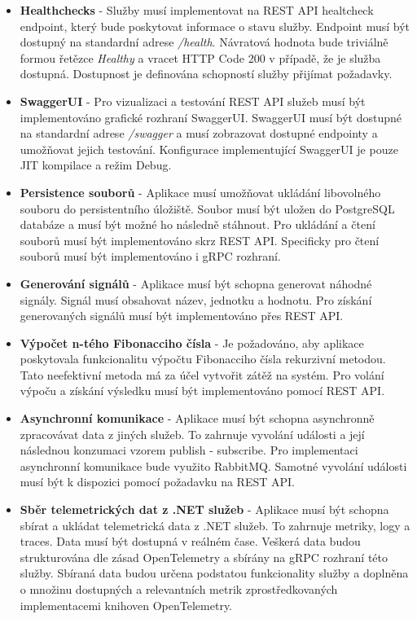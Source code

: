 \begin{itemize}
  \item \textbf{Healthchecks} - Služby musí implementovat na REST API healtcheck endpoint, který bude poskytovat informace o stavu služby. Endpoint musí být dostupný na standardní adrese \emph{/health}. Návratová hodnota bude triviálně formou řetězce \emph{Healthy} a vracet HTTP Code 200 v případě, že je služba dostupná. Dostupnost je definována schopností služby přijímat požadavky.
  \item \textbf{SwaggerUI} - Pro vizualizaci a testování REST API služeb musí být implementováno grafické rozhraní SwaggerUI. SwaggerUI musí být dostupné na standardní adrese \emph{/swagger} a musí zobrazovat dostupné endpointy a umožňovat jejich testování. Konfigurace implementující SwaggerUI je pouze JIT kompilace a režim Debug.
  \item \textbf{Persistence souborů} - Aplikace musí umožňovat ukládání libovolného souboru do persistentního úložiště. Soubor musí být uložen do PostgreSQL databáze a musí být možné ho následně stáhnout. Pro ukládání a čtení souborů musí být implementováno skrz REST API. Specificky pro čtení souborů musí být implementováno i gRPC rozhraní.
  \item \textbf{Generování signálů} - Aplikace musí být schopna generovat náhodné signály. Signál musí obsahovat název, jednotku a hodnotu. Pro získání generovaných signálů musí být implementováno přes REST API.
  \item \textbf{Výpočet n-tého Fibonacciho čísla} - Je požadováno, aby aplikace poskytovala funkcionalitu výpočtu Fibonacciho čísla rekurzivní metodou. Tato neefektivní metoda má za účel vytvořit zátěž na systém. Pro volání výpoču a získání výsledku musí být implementováno pomocí REST API.
  \item \textbf{Asynchronní komunikace} - Aplikace musí být schopna asynchronně zpracovávat data z jiných služeb. To zahrnuje vyvolání události a její následnou konzumaci vzorem publish - subscribe. Pro implementaci asynchronní komunikace bude využito RabbitMQ. Samotné vyvolání události musí být k dispozici pomocí požadavku na REST API.
  \item \textbf{Sběr telemetrických dat z .NET služeb} - Aplikace musí být schopna sbírat a ukládat telemetrická data z .NET služeb. To zahrnuje metriky, logy a traces. Data musí být dostupná v reálném čase. Veškerá data budou strukturována dle zásad OpenTelemetry a sbírány na gRPC rozhraní této služby. Sbíraná data budou určena podstatou funkcionality služby a doplněna o množinu dostupných a relevantních metrik zprostředkovaných implementacemi knihoven OpenTelemetry.

\end{itemize}
